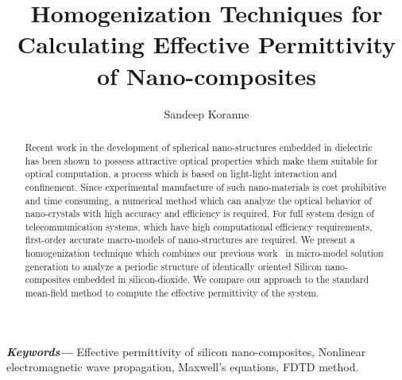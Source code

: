 \documentclass{article}[12pt]
\providecommand{\keywords}[1]{\textbf{\textit{Keywords---}} #1}
\theoremstyle{plain}
\begin{document}
\title{Homogenization Techniques for Calculating
  Effective Permittivity of Nano-composites}
\author{Sandeep Koranne}
\maketitle
\begin{abstract}
Recent work in the development of spherical nano-structures embedded in dielectric
has been shown to possess attractive optical properties which make them suitable for optical
computation,  a process which is based on light-light interaction and confinement.
Since experimental manufacture of such nano-materials is cost prohibitive and time consuming, a
numerical method which can analyze the optical behavior of nano-crystals with high accuracy and
efficiency is required.
For full system design of telecommunication systems, which have high computational
efficiency requirements, 
first-order accurate macro-models of nano-structures
are required. We present a homogenization technique which combines our previous work~\cite{koranne_optics}
in micro-model solution generation to analyze a periodic structure of identically
oriented Silicon nano-composites embedded in silicon-dioxide. We compare our approach
to the standard mean-field method to compute the effective permittivity of the
system. 
\end{abstract}
\keywords{
  Effective permittivity of silicon nano-composites,
  Nonlinear electromagnetic wave propagation, Maxwell's equations, FDTD method.}
\end{document}
